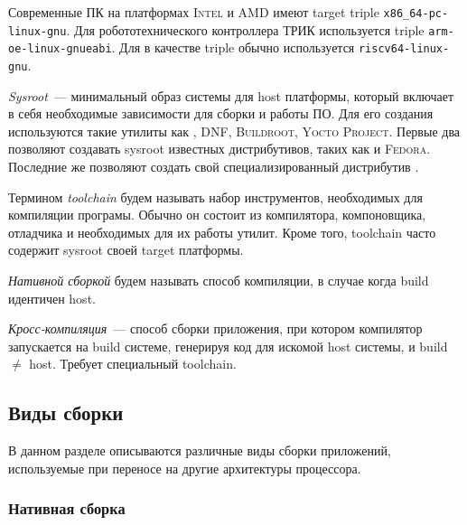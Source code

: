 Современные ПК на платформах \textsc{Intel} и \textsc{AMD} имеют target triple \texttt{x86\_64-pc-linux-gnu}.
Для робототехнического контроллера ТРИК используется triple \texttt{arm-oe-linux-gnueabi}.
Для \riscv{} в качестве triple обычно используется \texttt{riscv64-linux-gnu}.

\begin{definition}[Sysroot]
	\textit{Sysroot}~--- минимальный образ системы для host платформы, который включает в себя необходимые зависимости для сборки и работы ПО.
	Для его создания используются такие утилиты как \debootstrap{}, \textsc{DNF}, \textsc{Buildroot}, \textsc{Yocto Project}.
	Первые два позволяют создавать sysroot известных дистрибутивов, таких как \debian{} и \textsc{Fedora}.
	Последние же позволяют создать свой специализированный дистрибутив \linux{}.
\end{definition}

\begin{definition}[Toolchain]
	Термином \textit{toolchain} будем называть набор инструментов, необходимых для компиляции програмы.
	Обычно он состоит из компилятора, компоновщика, отладчика и необходимых для их работы утилит.
	Кроме того, toolchain часто содержит sysroot своей target платформы.
\end{definition}

\begin{definition}
	\textit{Нативной сборкой} будем называть способ компиляции, в случае когда build идентичен host.
\end{definition}

\begin{definition}
	\textit{Кросс-компиляция}~--- способ сборки приложения, при котором компилятор запускается на build системе, генерируя код для искомой host системы, и build $\neq$ host.
	Требует специальный toolchain.
\end{definition}


\subsection{Виды сборки}

В данном разделе описываются различные виды сборки приложений, используемые при переносе на другие архитектуры процессора.

\subsubsection{Нативная сборка}

